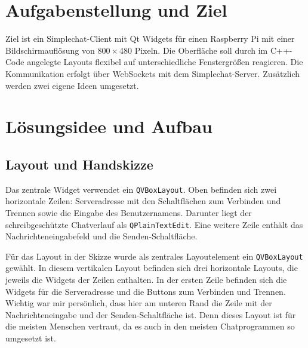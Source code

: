\section{Aufgabenstellung und Ziel}
Ziel ist ein Simplechat-Client mit Qt Widgets für einen Raspberry Pi mit
einer Bildschirmauflösung von 800\,\(\times\)\,480 Pixeln. Die Oberfläche
soll durch im C++-Code angelegte Layouts flexibel auf unterschiedliche
Fenstergrößen reagieren. Die Kommunikation erfolgt über WebSockets mit
dem Simplechat-Server. Zusätzlich werden zwei eigene Ideen umgesetzt.

\section{Lösungsidee und Aufbau}
\subsection{Layout und Handskizze}
Das zentrale Widget verwendet ein \texttt{QVBoxLayout}. Oben befinden sich
zwei horizontale Zeilen: Serveradresse mit den Schaltflächen zum Verbinden
und Trennen sowie die Eingabe des Benutzernamens. Darunter liegt der
schreibgeschützte Chatverlauf als \texttt{QPlainTextEdit}. Eine weitere
Zeile enthält das Nachrichteneingabefeld und die Senden-Schaltfläche.


Für das Layout in der Skizze wurde als zentrales Layoutelement ein \texttt{QVBoxLayout} gewählt. 
In diesem vertikalen Layout befinden sich drei horizontale Layouts, die jeweils die Widgets der Zeilen enthalten.
In der ersten Zeile befinden sich die Widgets für die Serveradresse und die Buttons zum Verbinden und Trennen.
Wichtig war mir persönlich, dass hier am unteren Rand die Zeile mit der Nachrichteneingabe und der Senden-Schaltfläche ist.
Denn dieses Layout ist für die meisten Menschen vertraut, da es auch in den meisten Chatprogrammen so umgesetzt ist.

\clearpage

